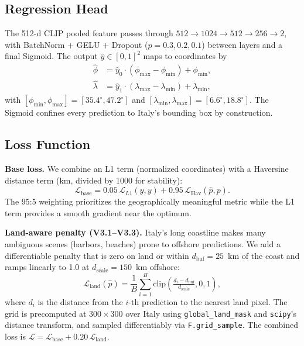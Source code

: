 \documentclass[10pt,twocolumn,letterpaper]{article}
\begin{document}
\subsection{Regression Head}

The 512-d CLIP pooled feature passes through
$512 \!\to\! 1024 \!\to\! 512 \!\to\! 256 \!\to\! 2$,
with BatchNorm + GELU + Dropout ($p{=}0.3,0.2,0.1$) between layers and a final
Sigmoid. The output $\hat{y}\in[0,1]^2$ maps to coordinates by
\begin{align}
\hat{\phi} &= \hat{y}_0\cdot(\phi_{\max}-\phi_{\min})+\phi_{\min}, \\
\hat{\lambda} &= \hat{y}_1\cdot(\lambda_{\max}-\lambda_{\min})+\lambda_{\min},
\end{align}
with $[\phi_{\min},\phi_{\max}]=[35.4^\circ,47.2^\circ]$ and
$[\lambda_{\min},\lambda_{\max}]=[6.6^\circ,18.8^\circ]$.
The Sigmoid confines every prediction to Italy's bounding box by construction.

\subsection{Loss Function}

\noindent\textbf{Base loss.} We combine an L1 term (normalized coordinates) with
a Haversine distance term (km, divided by 1000 for stability):
\begin{equation}
\mathcal{L}_{\text{base}}
  = 0.05\,\mathcal{L}_{L1}(\hat{y},y)
  + 0.95\,\mathcal{L}_{\text{Hav}}(\hat{p},p).
\end{equation}
The 95:5 weighting prioritizes the geographically meaningful metric while the L1
term provides a smooth gradient near the optimum.

\noindent\textbf{Land-aware penalty (V3.1--V3.3).}
Italy's long coastline makes many ambiguous scenes (harbors, beaches) prone to
offshore predictions. We add a differentiable penalty that is zero on land or
within $d_{\text{buf}}=25$~km of the coast and ramps linearly to 1.0 at
$d_{\text{scale}}=150$~km offshore:
\begin{equation}
\mathcal{L}_{\text{land}}(\hat{p})
  = \frac{1}{B}\sum_{i=1}^{B}
    \mathrm{clip}\!\left(\tfrac{d_i - d_{\text{buf}}}{d_{\text{scale}}},0,1\right),
\end{equation}
where $d_i$ is the distance from the $i$-th prediction to the nearest land pixel.
The grid is precomputed at $300\times300$ over Italy using
\texttt{global\_land\_mask} and \texttt{scipy}'s distance transform, and sampled
differentiably via \texttt{F.grid\_sample}. The combined loss is
$\mathcal{L} = \mathcal{L}_{\text{base}} + 0.20\,\mathcal{L}_{\text{land}}$.
\end{document}
